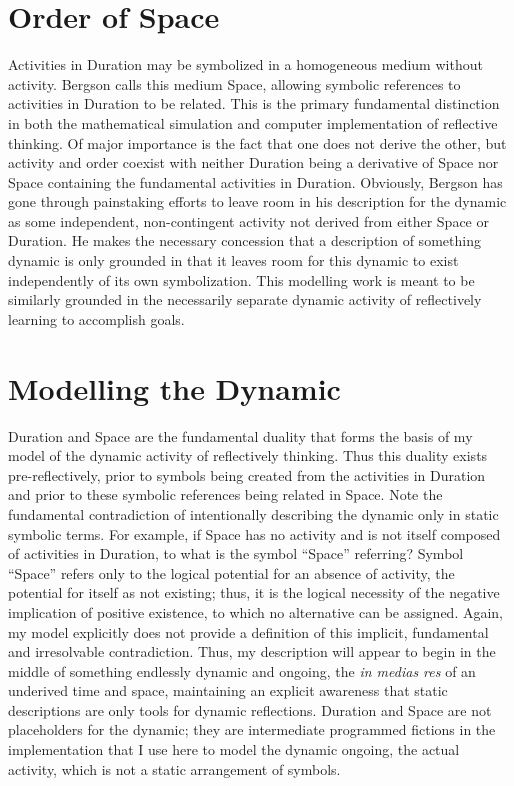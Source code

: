 \section{Order of Space}

Activities in Duration may be symbolized in a homogeneous medium
without activity.  Bergson calls this medium Space, allowing symbolic
references to activities in Duration to be related.  This is the
primary fundamental distinction in both the mathematical simulation
and computer implementation of reflective thinking.  Of major
importance is the fact that one does not derive the other, but
activity and order coexist with neither Duration being a derivative of
Space nor Space containing the fundamental activities in Duration.
Obviously, Bergson has gone through painstaking efforts to leave room
in his description for the dynamic as some independent, non-contingent
activity not derived from either Space or Duration.  He makes the
necessary concession that a description of something dynamic is only
grounded in that it leaves room for this dynamic to exist
independently of its own symbolization.  This modelling work is meant
to be similarly grounded in the necessarily separate dynamic activity
of reflectively learning to accomplish goals.

\section{Modelling the Dynamic}
\label{section:modelling_the_dynamic}

Duration and Space are the fundamental duality that forms the basis of
my model of the dynamic activity of reflectively thinking.  Thus this
duality exists pre-reflectively, prior to symbols being created from
the activities in Duration and prior to these symbolic references
being related in Space.  Note the fundamental contradiction of
intentionally describing the dynamic only in static symbolic terms.
For example, if Space has no activity and is not itself composed of
activities in Duration, to what is the symbol ``Space'' referring?
Symbol ``Space'' refers only to the logical potential for an absence
of activity, the potential for itself as not existing; thus, it is the
logical necessity of the negative implication of positive existence,
to which no alternative can be assigned.  Again, my model explicitly
does not provide a definition of this implicit, fundamental and
irresolvable contradiction.  Thus, my description will appear to begin
in the middle of something endlessly dynamic and ongoing, the \emph{in
  medias res} of an underived time and space, maintaining an explicit
awareness that static descriptions are only tools for dynamic
reflections.  Duration and Space are not placeholders for the dynamic;
they are intermediate programmed fictions in the implementation that I
use here to model the dynamic ongoing, the actual activity, which is
not a static arrangement of symbols.

